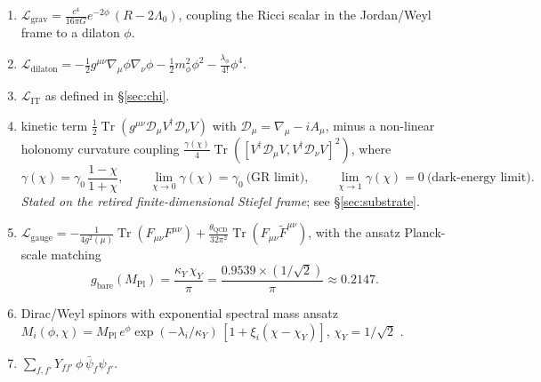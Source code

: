 \documentclass{alienfolio}
\begin{document}
\begin{enumerate}
\item {}
$\displaystyle \mathcal{L}_{\mathrm{grav}}
= \frac{c^4}{16\pi G}e^{-2\phi}\,(R - 2\Lambda_0)$,
coupling the Ricci scalar in the Jordan/Weyl frame to a dilaton $\phi$.

\item {}
$\displaystyle \mathcal{L}_{\mathrm{dilaton}}
= -\tfrac{1}{2}g^{\mu\nu}\nabla_\mu\phi\nabla_\nu\phi
- \tfrac{1}{2}m_\phi^2\phi^2 - \tfrac{\lambda_\phi}{4!}\phi^4$.

\item {} $\mathcal{L}_{\mathrm{IT}}$ as
defined in \S\ref{sec:chi}.

\item {} kinetic term
$\tfrac{1}{2}\operatorname{Tr}(g^{\mu\nu}
\mathcal{D}_\mu V^\dagger \mathcal{D}_\nu V)$ with
$\mathcal{D}_\mu = \nabla_\mu - iA_\mu$, minus a non-linear holonomy
curvature coupling
$\tfrac{\gamma(\chi)}{4}\operatorname{Tr}([V^\dagger\mathcal{D}_\mu V,
V^\dagger\mathcal{D}_\nu V]^2)$,
where
\begin{equation}
\gamma(\chi) = \gamma_0\,\frac{1-\chi}{1+\chi},
\qquad \lim_{\chi\to0}\gamma(\chi)=\gamma_0\ \text{(GR limit)},
\qquad \lim_{\chi\to1}\gamma(\chi)=0\ \text{(dark-energy limit)}.
\end{equation}
\emph{Stated on the retired finite-dimensional Stiefel frame}; see
\S\ref{sec:substrate}.

\item {}
$\displaystyle \mathcal{L}_{\mathrm{gauge}}
= -\frac{1}{4g^2(\mu)}\operatorname{Tr}(F_{\mu\nu}F^{\mu\nu})
+ \frac{\theta_{\mathrm{QCD}}}{32\pi^2}
\operatorname{Tr}(F_{\mu\nu}\tilde{F}^{\mu\nu})$,
with the ansatz Planck-scale matching
\begin{equation}
g_{\mathrm{bare}}(M_{\mathrm{Pl}})
= \frac{\kappa_Y\,\chi_Y}{\pi}
= \frac{0.9539 \times (1/\sqrt{2})}{\pi}
\approx 0.2147 .
\end{equation}

\item {} Dirac/Weyl spinors with exponential
spectral mass ansatz
$M_i(\phi,\chi) = M_{\mathrm{Pl}}\,e^{\phi}
\exp(-\lambda_i/\kappa_Y)\,[1 + \xi_i(\chi-\chi_Y)]$,
$\chi_Y = 1/\sqrt{2}$ .

\item {} $\sum_{f,f'} Y_{ff'}\,\phi\,\bar\psi_f\psi_{f'}$.
\end{enumerate}
\end{document}
